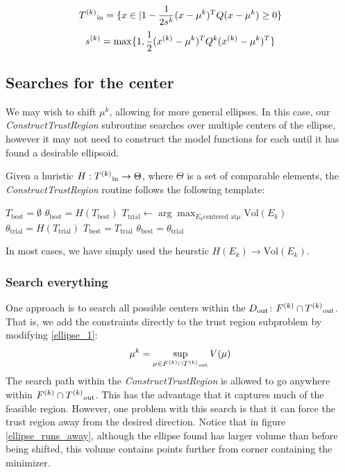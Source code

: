 $${T^{(k)}}_{\text{in}} = \{x \in \mathbb | 1 - \frac 1 {2s^k} (x - \mu^{k})^T Q (x - \mu^{k}) \ge 0\} $$
$${s}^{(k)} = \max \{1, \frac 1 {2} ({x}^{(k)} - \mu^{k})^T Q^k ({x}^{(k)} - \mu^{k})^T \}$$


\subsection{Searches for the center}

We may wish to shift $\mu^k$, allowing for more general ellipses.
In this case, our \emph{ConstructTrustRegion} subroutine searches over multiple centers of the ellipse, however it may not need to construct the model functions for each until it has found a desirable ellipsoid.

Given a huristic $H : {T^{(k)}}_{\text{in}} \to \Theta$, where $\Theta$ is a set of comparable elements, the \emph{ConstructTrustRegion} routine follows the following template:

\begin{algorithmic}
    \State $T_{\text{best}} = \emptyset$
    \State $\theta_{\text{best}} = H(T_{\text{best}})$
        \State $T_{\text{trial}} \gets \arg\max_{E_k \text{centered at} \mu} \text{Vol}(E_k)$
        \State $\theta_{\text{trial}} = H(T_{\text{trial}})$
            \State $T_{\text{best}} = T_{\text{trial}}$
            \State $\theta_{\text{best}} = \theta_{\text{trial}}$
        \EndIf{}
    \EndFor
\EndProcedure
\end{algorithmic}

In most cases, we have simply used the heurstic $H(E_k) \to \text{Vol}(E_k)$.

\subsubsection{Search everything}

One approach is to search all possible centers within the $ D_{\text{out}} $:
$ {F}^{(k)} \cap {T^{(k)}}_{\text{out}}$.
That is, we add the constraints directly to the trust region subproblem by modifying \ref{ellipse_1}:
$$\mu^k = \sup_{\mu \in {F}^{(k)} \cap {T^{(k)}}_{\text{out}}} V(\mu)$$
The search path within the \emph{ConstructTrustRegion} is allowed to go anywhere within $ {F}^{(k)} \cap {T^{(k)}}_{\text{out}}$.
This has the advantage that it captures much of the feasible region.
However, one problem with this search is that it can force the trust region away from the desired direction.
Notice that in figure \ref{ellipse_runs_away}, although the ellipse found has larger volume than before being shifted, this volume contains points further from corner containing the minimizer.

